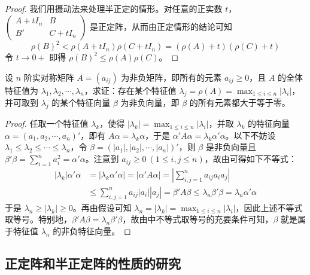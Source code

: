 \documentclass[../../main.tex]{subfiles}
\begin{document}
\begin{proof}
我们用摄动法来处理半正定的情形。对任意的正实数 \(t\)，\(\begin{pmatrix}
A + tI_n & B \\
B' & C + tI_n
\end{pmatrix}\) 是正定阵，从而由正定情形的结论可知
\[
\rho(B)^2 < \rho(A + tI_n)\rho(C + tI_n) = (\rho(A) + t)(\rho(C) + t)
\]
令 \(t \to 0+\) 即得 \(\rho(B)^2 \leqslant  \rho(A)\rho(C)\)。 
\end{proof}

\begin{proposition}\label{proposition:例9.58}
设 \(n\) 阶实对称矩阵 \(A = (a_{ij})\) 为非负矩阵，即所有的元素 \(a_{ij} \geqslant  0\)，且 \(A\) 的全体特征值为 \(\lambda_1,\lambda_2,\cdots,\lambda_n\)，求证：存在某个特征值 \(\lambda_j = \rho(A) = \max_{1\leqslant  i \leqslant  n}|\lambda_i|\)，并可取到 \(\lambda_j\) 的某个特征向量 \(\beta\) 为非负向量，即 \(\beta\) 的所有元素都大于等于零。
\end{proposition}
\begin{proof}
任取一个特征值 \(\lambda_k\)，使得 \(|\lambda_k| = \max_{1\leqslant  i \leqslant  n}|\lambda_i|\)，并取 \(\lambda_k\) 的特征向量 \(\alpha = (a_1,a_2,\cdots,a_n)'\)，即有 \(A\alpha = \lambda_k\alpha\)，于是 \(\alpha'A\alpha = \lambda_k\alpha'\alpha\)。以下不妨设 \(\lambda_1 \leqslant  \lambda_2 \leqslant  \cdots \leqslant  \lambda_n\)，令 \(\beta = (|a_1|,|a_2|,\cdots,|a_n|)'\)，则 \(\beta\) 是非负向量且 \(\beta'\beta = \sum_{i = 1}^{n}a_i^2 = \alpha'\alpha\)。注意到 \(a_{ij} \geqslant  0\ (1\leqslant  i,j \leqslant  n)\)，故由可得如下不等式：
\begin{align*}
|\lambda_k|\alpha'\alpha &= |\lambda_k\alpha'\alpha| = |\alpha'A\alpha| = \left|\sum_{i,j = 1}^{n}a_{ij}a_ia_j\right|\\
&\leqslant  \sum_{i,j = 1}^{n}a_{ij}|a_i||a_j| = \beta'A\beta \leqslant  \lambda_n\beta'\beta = \lambda_n\alpha'\alpha
\end{align*}
于是 \(\lambda_n \geqslant  |\lambda_k| \geqslant  0\)。再由假设可知 \(\lambda_n = |\lambda_k| = \max_{1\leqslant  i \leqslant  n}|\lambda_i|\)，因此上述不等式取等号。特别地，\(\beta'A\beta = \lambda_n\beta'\beta\)，故由中不等式取等号的充要条件可知，\(\beta\) 就是属于特征值 \(\lambda_n\) 的非负特征向量。 
\end{proof}


\subsection{正定阵和半正定阵的性质的研究}
\end{document}
